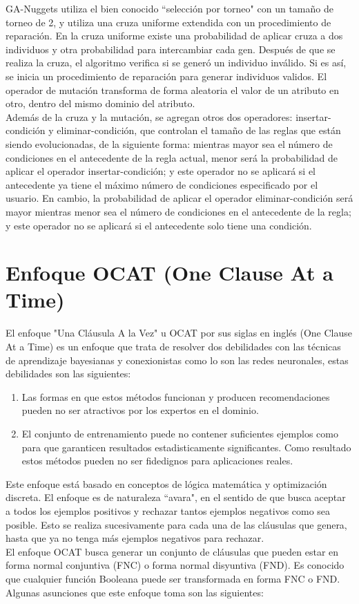 GA-Nuggets utiliza el bien conocido ``selección por torneo" con un tamaño de torneo de 2, y utiliza una cruza uniforme extendida con un procedimiento de reparación. En la cruza uniforme existe una probabilidad de aplicar cruza a dos individuos y otra probabilidad para intercambiar cada gen. Después de que se realiza la cruza, el algoritmo verifica si se generó un individuo inválido. Si es así, se inicia un procedimiento de reparación para generar individuos validos. El operador de mutación transforma de forma aleatoria el valor de un atributo en otro, dentro del mismo dominio del atributo.
\\
Además de la cruza y la mutación, se agregan otros dos operadores: insertar-condición y eliminar-condición, que controlan el tamaño de las reglas que están siendo evolucionadas, de la siguiente forma: mientras mayor sea el número de condiciones en el antecedente de la regla actual, menor será la probabilidad de aplicar el operador insertar-condición; y este operador no se aplicará si el antecedente ya tiene el máximo número de condiciones especificado por el usuario. En cambio, la probabilidad de aplicar el operador eliminar-condición será mayor mientras menor sea el número de condiciones en el antecedente de la regla; y este operador no se aplicará si el antecedente solo tiene una condición.

\section{Enfoque OCAT (One Clause At a Time)}

El enfoque "Una Cláusula A la Vez" u OCAT por sus siglas en inglés (One Clause At a Time) es un enfoque que trata de resolver dos debilidades con las técnicas de aprendizaje bayesianas y conexionistas como lo son las redes neuronales, estas debilidades son las siguientes:

\begin{enumerate}
	\item Las formas en que estos métodos funcionan y producen recomendaciones pueden no ser atractivos por los expertos en el dominio. 
	\item El conjunto de entrenamiento puede no contener suficientes ejemplos como para que garanticen resultados estadisticamente significantes. Como resultado estos métodos pueden no ser fidedignos para aplicaciones reales. 
\end{enumerate}

Este enfoque está basado en conceptos de lógica matemática y optimización discreta. El enfoque es de naturaleza ``avara", en el sentido de que busca aceptar a todos los ejemplos positivos y rechazar tantos ejemplos negativos como sea posible. Esto se realiza sucesivamente para cada una de las cláusulas que genera, hasta que ya no tenga más ejemplos negativos para rechazar.
\\
El enfoque OCAT busca generar un conjunto de cláusulas que pueden estar en forma normal conjuntiva (FNC) o forma normal disyuntiva (FND). Es conocido \citep{peysakh1987fast} que cualquier función Booleana puede ser transformada en forma FNC o FND. 
\\
Algunas asunciones que este enfoque toma son las siguientes:

